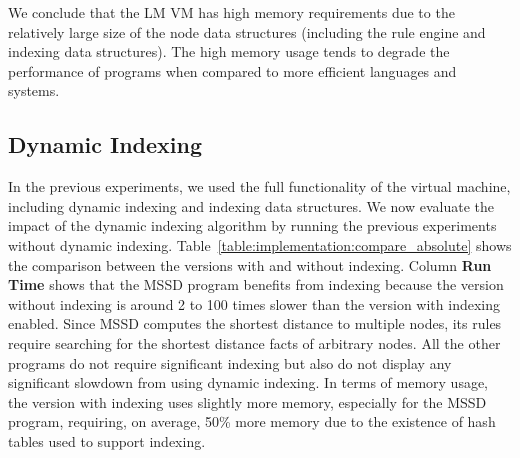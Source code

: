 We conclude that the LM VM has high memory requirements due to the relatively
large size of the node data structures (including the rule engine and indexing
data structures). The high memory usage tends to degrade the performance of
programs when compared to more efficient languages and systems.

\subsection{Dynamic Indexing}

In the previous experiments, we used the full functionality of the virtual
machine, including dynamic indexing and indexing data structures. We now
evaluate the impact of the dynamic indexing algorithm by running the previous
experiments without dynamic indexing.
Table~\ref{table:implementation:compare_absolute} shows the comparison between
the versions with and without indexing.  Column \textbf{Run Time} shows that the
MSSD program benefits from indexing because the version without indexing is
around 2 to 100 times slower than the version with indexing enabled. Since MSSD
computes the shortest distance to multiple nodes, its rules require searching
for the shortest distance facts of arbitrary nodes. All the other programs do
not require significant indexing but also do not display any significant
slowdown from using dynamic indexing. In terms of memory usage, the version with
indexing uses slightly more memory, especially for the MSSD program, requiring,
on average, 50\% more memory due to the existence of hash tables used to support
indexing.

\begin{table}[ht]
   \begin{center}
      
   \end{center}


   \label{table:implementation:compare_absolute}
\end{table}
